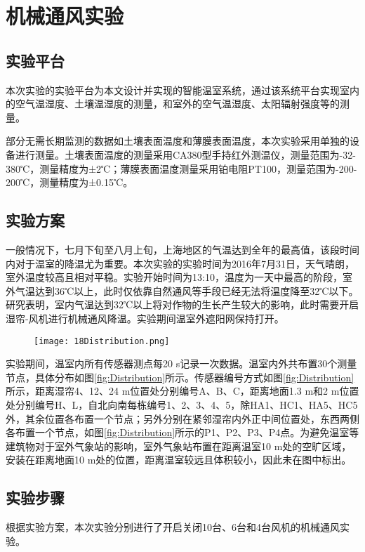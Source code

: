\section{机械通风实验}
	\subsection{实验平台}
本次实验的实验平台为本文设计并实现的智能温室系统，通过该系统平台实现室内的空气温湿度、土壤温湿度的测量，和室外的空气温湿度、太阳辐射强度等的测量。
	
部分无需长期监测的数据如土壤表面温度和薄膜表面温度，本次实验采用单独的设备进行测量。土壤表面温度的测量采用CA380型手持红外测温仪，测量范围为-32-380℃，测量精度为±2℃；薄膜表面温度测量采用铂电阻PT100，测量范围为-200-200℃，测量精度为±0.15℃。

	\subsection{实验方案}
一般情况下，七月下旬至八月上旬，上海地区的气温达到全年的最高值，该段时间内对于温室的降温尤为重要。本次实验的实验时间为2016年7月31日，天气晴朗，室外温度较高且相对平稳。实验开始时间为13:10，温度为一天中最高的阶段，室外气温达到36℃以上，此时仅依靠自然通风等手段已经无法将温度降至32℃以下。研究表明，室内气温达到32℃以上将对作物的生长产生较大的影响，此时需要开启湿帘-风机进行机械通风降温。实验期间温室外遮阳网保持打开。

	\begin{figure}[!htbp]
		\centering
		\texttt{[image: 18Distribution.png]}
	\end{figure}
实验期间，温室内所有传感器测点每20 s记录一次数据。温室内外共布置30个测量节点，具体分布如图\ref{fig:Distribution}所示。传感器编号方式如图\ref{fig:Distribution}所示，距离湿帘4、12、24 m位置处分别编号A、B、C，距离地面1.3 m和2 m位置处分别编号H、L，自北向南每栋编号1、2、3、4、5，除HA1、HC1、HA5、HC5外，其余位置各布置一个节点；另外分别在紧邻湿帘内外正中间位置处，东西两侧各布置一个节点，如图\ref{fig:Distribution}所示的P1、P2、P3、P4点。为避免温室等建筑物对于室外气象站的影响，室外气象站布置在距离温室10 m处的空旷区域，安装在距离地面10 m处的位置，距离温室较远且体积较小，因此未在图中标出。

	\subsection{实验步骤}
根据实验方案，本次实验分别进行了开启关闭10台、6台和4台风机的机械通风实验。
	
